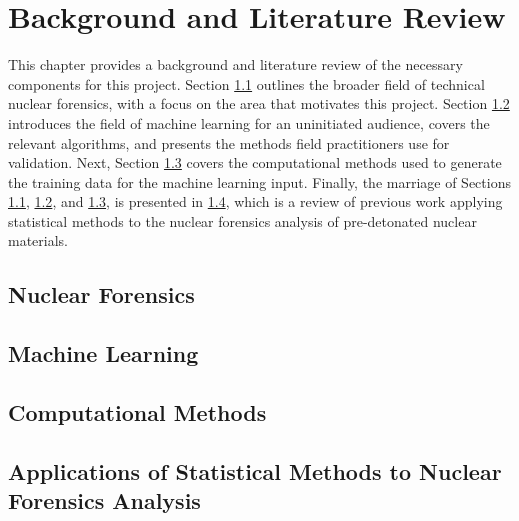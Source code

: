 \chapter{Background and Literature Review}
\label{ch:litrev}

This chapter provides a background and literature review of the necessary
components for this project. Section \ref{sec:nfoverview} outlines the broader
field of technical nuclear forensics, with a focus on the area that motivates
this project.  Section \ref{sec:mlback} introduces the field of machine
learning for an uninitiated audience, covers the relevant algorithms, and
presents the methods field practitioners use for validation. Next, Section
\ref{sec:fcsim} covers the computational methods used to generate the training
data for the machine learning input. Finally, the marriage of Sections
\ref{sec:nfoverview}, \ref{sec:mlback}, and \ref{sec:fcsim}, is presented in
\ref{sec:stats4nf}, which is a review of previous work applying statistical
methods to the nuclear forensics analysis of pre-detonated nuclear materials. 

\section{Nuclear Forensics}
\label{sec:nfoverview}


\section{Machine Learning}
\label{sec:mlback}


\section{Computational Methods}
\label{sec:fcsim}


\section{Applications of Statistical Methods to Nuclear Forensics Analysis}
\label{sec:stats4nf}


